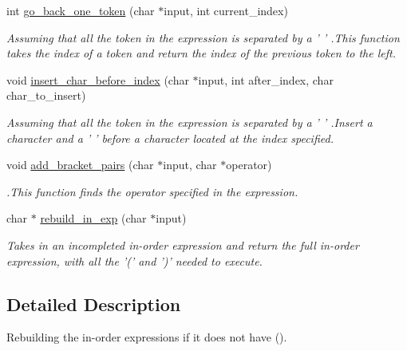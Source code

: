\begin{DoxyCompactItemize}
int \hyperlink{structin__exp__rebuilder_a79101218986d1c921abf48a0a7bbd3b5}{go\-\_\-back\-\_\-one\-\_\-token} (char $\ast$input, int current\-\_\-index)
\begin{DoxyCompactList}\small\item\em Assuming that all the token in the expression is separated by a ' ' .This function takes the index of a token and return the index of the previous token to the left. \end{DoxyCompactList}\item 
void \hyperlink{structin__exp__rebuilder_a603b20afff7b841b6bb7c1b8bd63f7c4}{insert\-\_\-char\-\_\-before\-\_\-index} (char $\ast$input, int after\-\_\-index, char char\-\_\-to\-\_\-insert)
\begin{DoxyCompactList}\small\item\em Assuming that all the token in the expression is separated by a ' ' .Insert a character and a ' ' before a character located at the index specified. \end{DoxyCompactList}\item 
void \hyperlink{structin__exp__rebuilder_add0bc435a55d29f6f3eba4eb51564c9e}{add\-\_\-bracket\-\_\-pairs} (char $\ast$input, char $\ast$operator)
\begin{DoxyCompactList}\small\item\em .This function finds the operator specified in the expression. \end{DoxyCompactList}\item 
char $\ast$ \hyperlink{structin__exp__rebuilder_a67d5706a4b5015411fea45aa77f2ea5f}{rebuild\-\_\-in\-\_\-exp} (char $\ast$input)
\begin{DoxyCompactList}\small\item\em Takes in an incompleted in-\/order expression and return the full in-\/order expression, with all the '(' and ')' needed to execute. \end{DoxyCompactList}\end{DoxyCompactItemize}


\subsection{Detailed Description}
Rebuilding the in-\/order expressions if it does not have (). 

